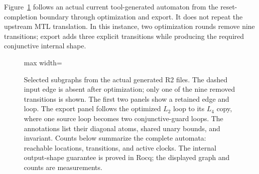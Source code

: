 Figure~\ref{fig:R2-generated} follows an actual current tool-generated automaton from the reset-completion boundary through optimization and export. It does not repeat the upstream MTL translation. In this instance, two optimization rounds remove nine transitions; export adds three explicit transitions while producing the required conjunctive internal shape.

\begin{figure}[t]
\centering
\begin{adjustbox}{max width=\textwidth}\end{adjustbox}
\caption{Selected subgraphs from the actual generated R2 files. The dashed input edge is absent after optimization; only one of the nine removed transitions is shown. The first two panels show a retained edge and loop. The export panel follows the optimized $L_2$ loop to its $L_4$ copy, where one source loop becomes two conjunctive-guard loops. The annotations list their diagonal atoms, shared unary bounds, and invariant. Counts below summarize the complete automata: reachable locations, transitions, and active clocks. The internal output-shape guarantee is proved in Rocq; the displayed graph and counts are measurements.}
\label{fig:R2-generated}
\end{figure}
